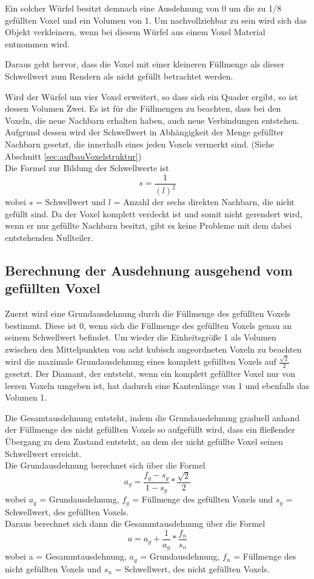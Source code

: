 Ein solcher Würfel besitzt demnach eine Ausdehnung von 0 um die zu 1/8 gefüllten Voxel und ein Volumen von 1. Um nachvollziehbar zu sein wird sich das Objekt verkleinern, wenn bei diesem Würfel aus einem Voxel Material entnommen wird.

Daraus geht hervor, dass die Voxel mit einer kleineren Füllmenge als dieser Schwellwert zum Rendern als nicht gefüllt betrachtet werden.

Wird der Würfel um vier Voxel erweitert, so dass sich ein Quader ergibt, so ist dessen Volumen Zwei. Es ist für die Füllmengen zu beachten, dass bei den Voxeln, die neue Nachbarn erhalten haben, auch neue Verbindungen entstehen. Aufgrund dessen wird der Schwellwert in Abhängigkeit der Menge gefüllter Nachbarn gesetzt, die innerhalb eines jeden Voxels vermerkt sind. (Siehe Abschnitt \ref{sec:aufbauVoxelstruktur})
\\

Die Formel zur Bildung der Schwellwerte ist
\[s = \frac{1}{(l)^{2}}\]
wobei $s$ = Schwellwert und $l$ = Anzahl der sechs direkten Nachbarn, die nicht gefüllt sind. Da der Voxel komplett verdeckt ist und somit nicht gerendert wird, wenn er nur gefüllte Nachbarn besitzt, gibt es keine Probleme mit dem dabei entstehenden Nullteiler.

\subsection{Berechnung der Ausdehnung ausgehend vom gefüllten Voxel}
Zuerst wird eine Grundausdehnung durch die Füllmenge des gefüllten Voxels bestimmt. Diese ist 0, wenn sich die Füllmenge des gefüllten Voxels genau an seinem Schwellwert befindet. Um wieder die Einheitsgröße 1 als Volumen zwischen den Mittelpunkten von acht kubisch angeordneten Voxeln zu beachten wird die maximale Grundausdehnung eines komplett gefüllten Voxels auf $\frac{\sqrt{2}}{2}$ gesetzt. Der Diamant, der entsteht, wenn ein komplett gefüllter Voxel nur von leeren Voxeln umgeben ist, hat dadurch eine Kantenlänge von 1 und ebenfalls das Volumen 1.

Die Gesamtausdehnung entsteht, indem die Grundausdehnung graduell anhand der Füllmenge des nicht gefüllten Voxels so aufgefüllt wird, dass ein fließender Übergang zu dem Zustand entsteht, an dem der nicht gefüllte Voxel seinen Schwellwert erreicht.
\\

Die Grundausdehnung berechnet sich über die Formel
\[a_g= \frac{f_g-s_g}{1-s_g}*\frac{\sqrt{2}}{2}\]
wobei $a_g$ = Grundausdehnung, $f_g$ = Füllmenge des gefüllten Voxels und $s_g$ = Schwellwert, des gefüllten Voxels.
\\

Daraus berechnet sich dann die Gesammtausdehnung über die Formel
\[a = a_g + \frac{1}{a_g} * \frac{f_n}{s_n}\]
wobei a = Gesammtausdehnung, $a_g$ = Grundausdehnung, $f_n$ = Füllmenge des nicht gefüllten Voxels und $s_n$ = Schwellwert, des nicht gefüllten Voxels.